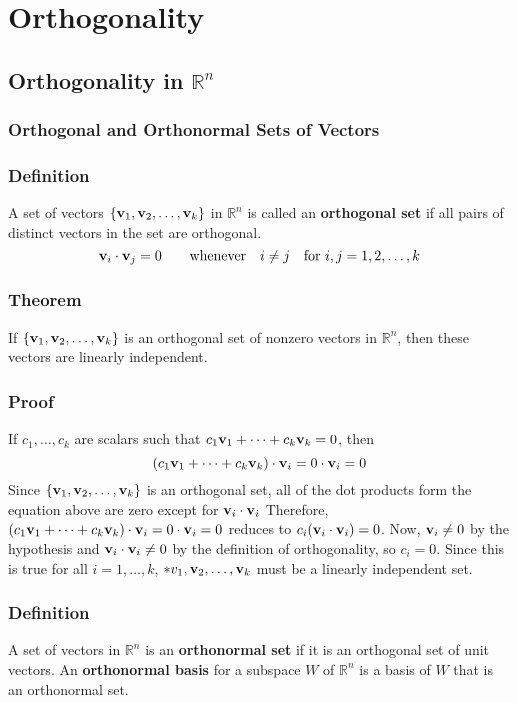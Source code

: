 \chapter{Orthogonality}

\section{Orthogonality in $\mathbb{R}^n$}

\subsection*{Orthogonal and Orthonormal Sets of Vectors}

\subsection*{Definition}
A set of vectors $\{\mathbf{v}_1,\mathbf{v}_2,\dots,\mathbf{v}_k\}$ in $\mathbb{R}^n$ is called an
\textbf{orthogonal set} if all pairs of distinct vectors in the set are orthogonal.
\[
    \mathbf{v}_i\cdot\mathbf{v}_j=0 \qquad \text{whenever} \quad i\neq j \quad \text{for } i,j=1,2,\dots,k
\]

\subsection*{Theorem}
If $\{\mathbf{v}_1,\mathbf{v}_2,\dots,\mathbf{v}_k\}$ is an orthogonal set of nonzero vectors in $\mathbb{R}^n$,
then these vectors are linearly independent.

\subsection*{Proof}
If $c_1,\dots,c_k$ are scalars such that $c_1\mathbf{v}_1+\dots+c_k\mathbf{v}_k=0$, then
\[(c_1\mathbf{v}_1+\dots+c_k\mathbf{v}_k)\cdot\mathbf{v}_i=0\cdot\mathbf{v}_i=0\]
Since $\{\mathbf{v}_1,\mathbf{v}_2,\dots,\mathbf{v}_k\}$ is an orthogonal set, all of the dot products
form the equation above are zero except for $\mathbf{v}_i\cdot\mathbf{v}_i$
Therefore, $(c_1\mathbf{v}_1+\dots+c_k\mathbf{v}_k)\cdot\mathbf{v}_i=0\cdot\mathbf{v}_i=0$ reduces to $c_i(\mathbf{v}_i\cdot\mathbf{v}_i)=0$.
Now, $\mathbf{v}_i\neq0$ by the hypothesis and $\mathbf{v}_i\cdot\mathbf{v}_i\neq0$ by the definition of
orthogonality, so $c_i=0$. Since this is true for all $i=1,\dots,k$, $*v_1,\mathbf{v}_2,\dots,\mathbf{v}_k$
must be a linearly independent set.

\subsection*{Definition}
A set of vectors in $\mathbb{R}^n$ is an \textbf{orthonormal set} if it is
an orthogonal set of unit vectors. An \textbf{orthonormal basis} for a subspace $W$
of $\mathbb{R}^n$ is a basis of $W$ that is an orthonormal set.

